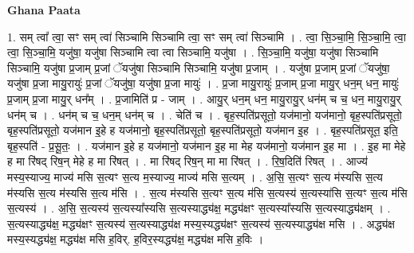 \documentclass[17pt]{extarticle}
\begin{document}
\textbf{Ghana Paata } \newline

1. सम् त्वा᳚ त्वा॒ सꣳ सम् त्वा॑ सिञ्चामि सिञ्चामि त्वा॒ सꣳ सम् त्वा॑ सिञ्चामि । . त्वा॒ सि॒ञ्चा॒मि॒ सि॒ञ्चा॒मि॒ त्वा॒ त्वा॒ सि॒ञ्चा॒मि॒ यजु॑षा॒ यजु॑षा सिञ्चामि त्वा त्वा सिञ्चामि॒ यजु॑षा । . सि॒ञ्चा॒मि॒ यजु॑षा॒ यजु॑षा सिञ्चामि सिञ्चामि॒ यजु॑षा प्र॒जाम् प्र॒जां ॅयजु॑षा सिञ्चामि सिञ्चामि॒ यजु॑षा प्र॒जाम् । . यजु॑षा प्र॒जाम् प्र॒जां ॅयजु॑षा॒ यजु॑षा प्र॒जा मायु॒रायुः॑ प्र॒जां ॅयजु॑षा॒ यजु॑षा प्र॒जा मायुः॑ । . प्र॒जा मायु॒रायुः॑ प्र॒जाम् प्र॒जा मायु॒र् धन॒म् धन॒ मायुः॑ प्र॒जाम् प्र॒जा मायु॒र् धन᳚म् । . प्र॒जामिति॑ प्र - जाम् । . आयु॒र् धन॒म् धन॒ मायु॒रायु॒र् धन॑म् च च॒ धन॒ मायु॒रायु॒र् धन॑म् च । . धन॑म् च च॒ धन॒म् धन॑म् च । . चेति॑ च । . बृह॒स्पति॑प्रसूतो॒ यज॑मानो॒ यज॑मानो॒ बृह॒स्पति॑प्रसूतो॒ बृह॒स्पति॑प्रसूतो॒ यज॑मान इ॒हे ह यज॑मानो॒ बृह॒स्पति॑प्रसूतो॒ बृह॒स्पति॑प्रसूतो॒ यज॑मान इ॒ह । . बृह॒स्पति॑प्रसूत॒ इति॒ बृह॒स्पति॑ - प्र॒सू॒तः॒ । . यज॑मान इ॒हे ह यज॑मानो॒ यज॑मान इ॒ह मा मेह यज॑मानो॒ यज॑मान इ॒ह मा । . इ॒ह मा मेहे ह मा रि॑षद् रिष॒न् मेहे ह मा रि॑षत् । . मा रि॑षद् रिष॒न् मा मा रि॑षत् । . रि॒ष॒दिति॑ रिषत् । . आज्य॑ मस्य॒स्याज्य॒ माज्य॑ मसि स॒त्यꣳ स॒त्य म॒स्याज्य॒ माज्य॑ मसि स॒त्यम् । . अ॒सि॒ स॒त्यꣳ स॒त्य म॑स्यसि स॒त्य म॑स्यसि स॒त्य म॑स्यसि स॒त्य म॑सि । . स॒त्य म॑स्यसि स॒त्यꣳ स॒त्य म॑सि स॒त्यस्य॑ स॒त्यस्या॑सि स॒त्यꣳ स॒त्य म॑सि स॒त्यस्य॑ । . अ॒सि॒ स॒त्यस्य॑ स॒त्यस्या᳚स्यसि स॒त्यस्याद्ध्य॑क्ष॒ मद्ध्य॑क्षꣳ स॒त्यस्या᳚स्यसि स॒त्यस्याद्ध्य॑क्षम् । . स॒त्यस्याद्ध्य॑क्ष॒ मद्ध्य॑क्षꣳ स॒त्यस्य॑ स॒त्यस्याद्ध्य॑क्ष मस्य॒स्यद्ध्य॑क्षꣳ स॒त्यस्य॑ स॒त्यस्याद्ध्य॑क्ष मसि । . अद्ध्य॑क्ष मस्य॒स्यद्ध्य॑क्ष॒ मद्ध्य॑क्ष मसि ह॒विर्. ह॒विर॒स्यद्ध्य॑क्ष॒ मद्ध्य॑क्ष मसि ह॒विः । \newline
\end{document}
